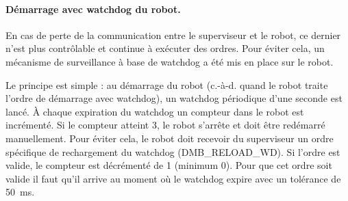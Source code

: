 \paragraph{Démarrage avec watchdog du robot.} En cas de perte de la communication entre le superviseur et le robot, ce dernier n'est plus contrôlable et continue à exécuter des ordres. Pour éviter cela, un mécanisme de surveillance à base de watchdog a été mis en place sur le robot.

Le principe est simple : au démarrage du robot (c.-à-d. quand le robot traite l'ordre de démarrage avec watchdog), un watchdog périodique d'une seconde est lancé. \`A chaque expiration du watchdog un compteur dans le robot est incrémenté. Si le compteur atteint 3, le robot s'arrête et doit être redémarré manuellement.  Pour éviter cela, le robot doit recevoir du superviseur un ordre spécifique de rechargement du watchdog (DMB\_RELOAD\_WD). Si l'ordre est valide, le compteur est décrémenté de 1 (minimum 0). Pour que cet ordre soit valide il faut qu'il arrive au moment où le watchdog expire avec un tolérance de 50~ms. \\


%
%

